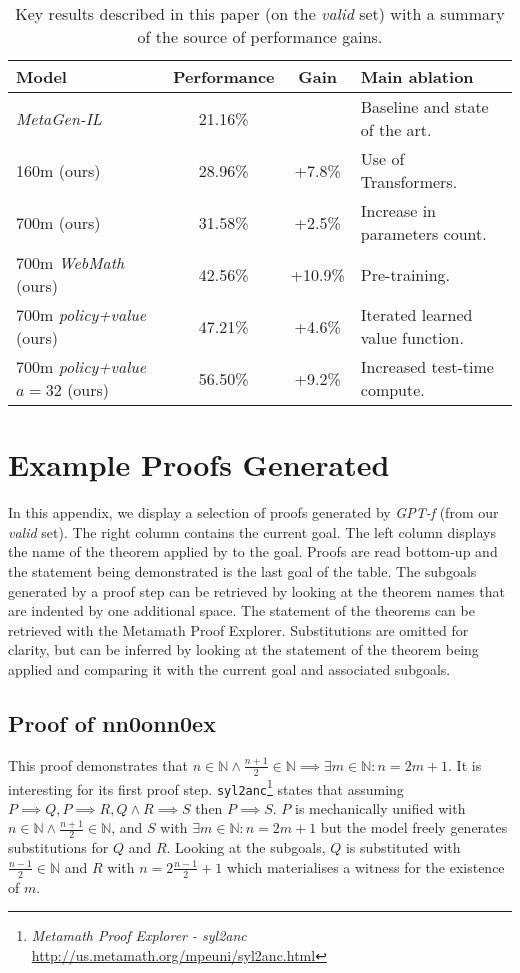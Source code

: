 \documentclass{article}
\begin{document}
\begin{table}[ht]
\caption{Key results described in this paper (on the \textit{valid} set) with a summary of the source of performance gains.}
\centering
\begin{tabular}{ |l|c|c|l| }
    \hline
    Model & Performance & Gain & Main ablation \\
    \hline
    \textit{MetaGen-IL}~\cite{wang2020learning} & 21.16\% & & Baseline and state of the art. \\
    160m (ours) & 28.96\% & +7.8\% & Use of Transformers. \\
    700m (ours) & 31.58\% & +2.5\% & Increase in parameters count. \\
    700m \textit{WebMath} (ours) & 42.56\% & +10.9\% & Pre-training. \\
    700m \textit{policy+value} (ours) & 47.21\% & +4.6\% & Iterated learned value function. \\
    700m \textit{policy+value} $a=32$ (ours) & 56.50\% & +9.2\% & Increased test-time compute. \\
    \hline
\end{tabular}
\label{table:keyresults}
\end{table}

\section{Example Proofs Generated}

In this appendix, we display a selection of proofs generated by \textit{GPT-f} (from our \textit{valid} set). The right column contains the current goal.  The left column displays the name of the theorem applied by to the goal. Proofs are read bottom-up and the statement being demonstrated is the last goal of the table. The subgoals generated by a proof step can be retrieved by looking at the theorem names that are indented by one additional space. The statement of the theorems can be retrieved with the Metamath Proof Explorer. Substitutions are omitted for clarity, but can be inferred by looking at the statement of the theorem being applied and comparing it with the current goal and associated subgoals.

\subsection{Proof of \textbf{nn0onn0ex}}

This proof demonstrates that $n \in \mathbb{N} \land \frac{n+1}{2} \in \mathbb{N} \implies \exists m \in \mathbb{N}: n = 2m+1$. It is interesting for its first proof step. \verb|syl2anc|\footnote{\textit{Metamath Proof Explorer - syl2anc} \url{http://us.metamath.org/mpeuni/syl2anc.html}} states that assuming $P \implies Q, P \implies R, Q \land R \implies S$ then $P \implies S$. $P$ is mechanically unified with $n \in \mathbb{N} \land \frac{n+1}{2} \in \mathbb{N}$, and $S$ with $\exists m \in \mathbb{N}: n = 2m+1$ but the model freely generates substitutions for $Q$ and $R$. Looking at the subgoals, $Q$ is substituted with $\frac{n-1}{2} \in \mathbb{N}$ and $R$ with $n = 2\frac{n-1}{2}+1$ which materialises a witness for the existence of $m$.
\end{document}
